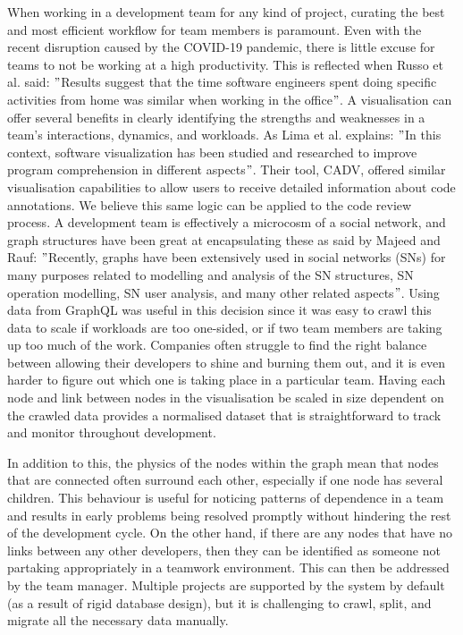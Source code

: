 \documentclass[sigconf]{acmart}
\begin{document}
When working in a development team for any kind of project,
curating the best and most efficient workflow for team members is paramount.
Even with the recent disruption caused by the COVID-19 pandemic, there is little excuse for teams to not be working at a high productivity.
This is reflected when Russo et al.
said: \("\)Results suggest that the time
software engineers spent doing specific activities from home was
similar when working in the office\("\)\cite{RussoEtAl}.
A visualisation can offer several benefits in clearly identifying the strengths and weaknesses in a team's interactions,
dynamics, and workloads.
As Lima et al.
explains: \("\)In this context, software visualization has been studied and researched to improve program comprehension in different aspects\("\)\cite{lima2023cadv}.
Their tool, CADV, offered similar visualisation capabilities to allow users to receive detailed information about code annotations.
We believe this same logic can be applied to the code review process.
A development team is effectively a microcosm of a social network, and graph structures have been great at encapsulating these as said by Majeed and Rauf: \("\)Recently, graphs have been extensively used in social networks (SNs) for many purposes related to modelling and analysis of the SN structures, SN operation modelling, SN user analysis, and many other related aspects\("\)\cite{MajeedAndRauf}.
Using data from GraphQL was useful in this decision
since it was easy to crawl this data to scale if workloads are too one-sided,
or if two team members are taking up too much of the work.
Companies often struggle to find the right balance between allowing their developers to shine and burning them out,
and it is even harder to figure out which one is taking place in a particular team.
Having each node and link between nodes in the visualisation be scaled in size dependent on the crawled data provides a normalised dataset
that is straightforward to track and monitor throughout development.


In addition to this,
the physics of the nodes within the graph mean that nodes that are connected often surround each other,
especially if one node has several children.
This behaviour is useful for noticing patterns of dependence in a team
and results in early problems being resolved promptly without hindering the rest of the development cycle.
On the other hand, if there are any nodes that have no links between any other developers,
then they can be identified as someone not partaking appropriately in a teamwork environment.
This can then be addressed by the team manager.
Multiple projects are supported by the system by default (as a result of rigid database design),
but it is challenging to crawl, split, and migrate all the necessary data manually.
\end{document}
